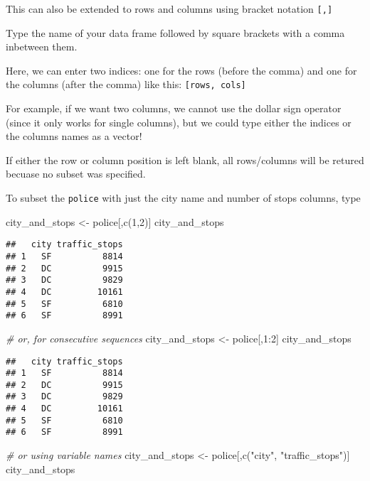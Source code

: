 \documentclass[
]{article}
\newenvironment{Shaded}{\begin{snugshade}}{\end{snugshade}}
\newcommand{\CommentTok}[1]{\textcolor[rgb]{0.56,0.35,0.01}{\textit{#1}}}
\newcommand{\DecValTok}[1]{\textcolor[rgb]{0.00,0.00,0.81}{#1}}
\newcommand{\FunctionTok}[1]{\textcolor[rgb]{0.00,0.00,0.00}{#1}}
\newcommand{\NormalTok}[1]{#1}
\newcommand{\OtherTok}[1]{\textcolor[rgb]{0.56,0.35,0.01}{#1}}
\newcommand{\SpecialCharTok}[1]{\textcolor[rgb]{0.00,0.00,0.00}{#1}}
\newcommand{\StringTok}[1]{\textcolor[rgb]{0.31,0.60,0.02}{#1}}
\begin{document}
This can also be extended to rows and columns using bracket notation
\texttt{{[},{]}}

Type the name of your data frame followed by square brackets with a
comma inbetween them.

Here, we can enter two indices: one for the rows (before the comma) and
one for the columns (after the comma) like this:
\texttt{{[}rows,\ cols{]}}

For example, if we want two columns, we cannot use the dollar sign
operator (since it only works for single columns), but we could type
either the indices or the columns names as a vector!

If either the row or column position is left blank, all rows/columns
will be retured becuase no subset was specified.

To subset the \texttt{police} with just the city name and number of
stops columns, type

\begin{Shaded}
\begin{Highlighting}[]
\NormalTok{city\_and\_stops }\OtherTok{\textless{}{-}}\NormalTok{ police[,}\FunctionTok{c}\NormalTok{(}\DecValTok{1}\NormalTok{,}\DecValTok{2}\NormalTok{)]}
\NormalTok{city\_and\_stops}
\end{Highlighting}
\end{Shaded}

\begin{verbatim}
##   city traffic_stops
## 1   SF          8814
## 2   DC          9915
## 3   DC          9829
## 4   DC         10161
## 5   SF          6810
## 6   SF          8991
\end{verbatim}

\begin{Shaded}
\begin{Highlighting}[]
\CommentTok{\# or, for consecutive sequences}
\NormalTok{city\_and\_stops }\OtherTok{\textless{}{-}}\NormalTok{ police[,}\DecValTok{1}\SpecialCharTok{:}\DecValTok{2}\NormalTok{]}
\NormalTok{city\_and\_stops}
\end{Highlighting}
\end{Shaded}

\begin{verbatim}
##   city traffic_stops
## 1   SF          8814
## 2   DC          9915
## 3   DC          9829
## 4   DC         10161
## 5   SF          6810
## 6   SF          8991
\end{verbatim}

\begin{Shaded}
\begin{Highlighting}[]
\CommentTok{\# or using variable names}
\NormalTok{city\_and\_stops }\OtherTok{\textless{}{-}}\NormalTok{ police[,}\FunctionTok{c}\NormalTok{(}\StringTok{"city"}\NormalTok{, }\StringTok{"traffic\_stops"}\NormalTok{)]}
\NormalTok{city\_and\_stops}
\end{Highlighting}
\end{Shaded}
\end{document}
